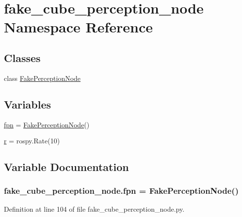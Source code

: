 \hypertarget{namespacefake__cube__perception__node}{}\section{fake\+\_\+cube\+\_\+perception\+\_\+node Namespace Reference}
\label{namespacefake__cube__perception__node}
\subsection*{Classes}
\begin{DoxyCompactItemize}
\item 
class \hyperlink{classfake__cube__perception__node_1_1FakePerceptionNode}{Fake\+Perception\+Node}
\end{DoxyCompactItemize}
\subsection*{Variables}
\begin{DoxyCompactItemize}
\item 
\hyperlink{namespacefake__cube__perception__node_a884c359a5cfb68aa706a9a0506d1ae2c}{fpn} = \hyperlink{classfake__cube__perception__node_1_1FakePerceptionNode}{Fake\+Perception\+Node}()
\item 
\hyperlink{namespacefake__cube__perception__node_a36e88703ab69fd35065e8a8d9344903e}{r} = rospy.\+Rate(10)
\end{DoxyCompactItemize}


\subsection{Variable Documentation}
\subsubsection[{\texorpdfstring{fpn}{fpn}}]{\setlength{\rightskip}{0pt plus 5cm}fake\+\_\+cube\+\_\+perception\+\_\+node.\+fpn = {\bf Fake\+Perception\+Node}()}\hypertarget{namespacefake__cube__perception__node_a884c359a5cfb68aa706a9a0506d1ae2c}{}\label{namespacefake__cube__perception__node_a884c359a5cfb68aa706a9a0506d1ae2c}


Definition at line 104 of file fake\+\_\+cube\+\_\+perception\+\_\+node.\+py.

